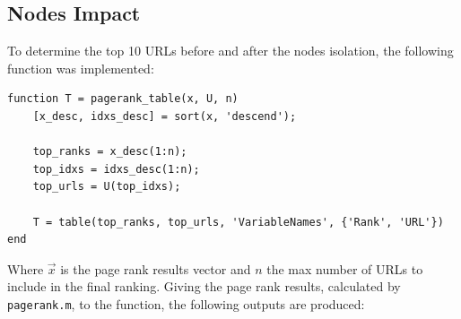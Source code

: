 \documentclass[unicode,11pt,a4paper,oneside,numbers=endperiod,openany]{scrartcl}
\begin{document}
\subsection{Nodes Impact}
To determine the top 10 URLs before and after the nodes isolation, the following function was implemented:
\vspace{.5em}
\begin{lstlisting}[style=Matlab-editor]
function T = pagerank_table(x, U, n)
    [x_desc, idxs_desc] = sort(x, 'descend');
    
    top_ranks = x_desc(1:n);
    top_idxs = idxs_desc(1:n);
    top_urls = U(top_idxs);
    
    T = table(top_ranks, top_urls, 'VariableNames', {'Rank', 'URL'})
end
\end{lstlisting}
\vspace{.5em}
Where $\vec{x}$ is the page rank results vector and $n$ the max number of URLs to include in the final ranking. Giving the page rank results, calculated by \texttt{pagerank.m}, to the function, the following outputs are produced:
\vspace{.5em}
\end{document}
